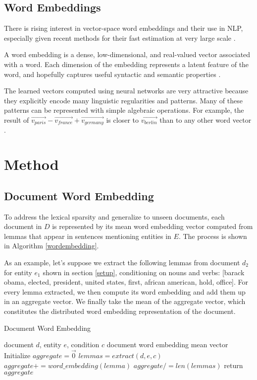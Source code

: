 \documentclass{article}
\begin{document}
\subsection{Word Embeddings}

There is rising interest in vector-space word embeddings and their use in NLP, especially given recent methods for their fast estimation at very large scale \cite{Arvind14}.

A word embedding is a dense, low-dimensional, and real-valued vector associated with a word. Each dimension of the embedding represents a latent feature of the word, and hopefully captures useful syntactic and semantic properties \cite{Turian10wordrepresentations}.

The learned vectors computed using neural networks are very attractive because they explicitly encode many linguistic regularities and patterns. Many of these patterns can be represented with simple algebraic operations. For example, the result of $\vec{v_{paris}} - \vec{v_{france}} + \vec{v_{germany}}$ is closer to $\vec{v_{berlin}}$ than to any other word vector \cite{mikolovChen,mikolovYih}.

\section{Method}
\label{approach}

\subsection{Document Word Embedding}
\label{docwordemb}

To address the lexical sparsity and generalize to unseen documents, each document in $D$ is represented by its mean word embedding vector computed from lemmas that appear in sentences mentioning entities in $E$. The process is shown in Algorithm \ref{wordembedding}. 

As an example, let's suppose we extract the following lemmas from document $d_2$ for entity $e_1$ shown in section \ref{setup}, conditioning on nouns and verbs: [barack obama, elected, president, united states, first, african american, hold, office]. For every lemma extracted, we then compute its word embedding and add them up in an aggregate vector. We finally take the mean of the aggregate vector, which constitutes the distributed word embedding representation of the document.

\begin{algorithm}[tb]
   \caption{Document Word Embedding}
   \label{wordembedding}
\begin{algorithmic}
    document $d$, entity $e$, condition $c$
    document word embedding mean vector
   \STATE Initialize $aggregate = \vec{0}$
   \STATE $lemmas = extract(d, e, c)$
   \STATE $aggregate += word\_embedding(lemma)$
   \ENDFOR
   \STATE $aggregate /= len(lemmas)$
   \STATE return $aggregate$
\end{algorithmic}
\end{algorithm}
\end{document}
